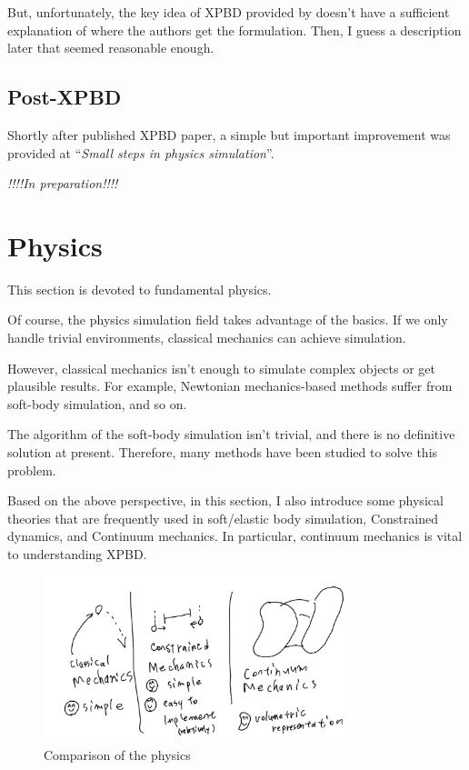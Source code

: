 \documentclass[pdflatex,sn-mathphys-num]{sn-jnl}%
\theoremstyle{thmstyleone}%
\theoremstyle{thmstyletwo}%
\theoremstyle{thmstylethree}%
\newcommand{\mainpname}[1]{``{\sl {#1}}''}
\newcommand{\inprep}{
	\begin{center}
		\sl\rm {!!!!In preparation!!!!}
\end{center}}
\begin{document}
But, unfortunately, the key idea of XPBD provided by \cite{Servin2006InteractiveSO} doesn't have a sufficient explanation of where the authors get the formulation. Then, I guess a description later that seemed reasonable enough.

\subsection{Post-XPBD}
Shortly after published XPBD paper, a simple but important improvement was provided at \mainpname{Small steps in physics simulation}\cite{SmallSteps}.
\inprep
\section{Physics}
This section is devoted to fundamental physics. 

Of course, the physics simulation field takes advantage of the basics.
If we only handle trivial environments, classical mechanics can achieve simulation. 

However, classical mechanics isn't enough to simulate complex objects or get plausible results. For example, Newtonian mechanics-based methods suffer from soft-body simulation, and so on.

The algorithm of the soft-body simulation isn't trivial, and there is no definitive solution at present. Therefore, many methods have been studied to solve this problem.

Based on the above perspective, in this section, I also introduce some physical theories that are frequently used in soft/elastic body simulation, Constrained dynamics, and Continuum mechanics.
In particular, continuum mechanics is vital to understanding XPBD.
\begin{figure}[h]
	\centering
	\includegraphics[width=0.8\textwidth]{images/Physics.png}
	\caption{Comparison of the physics}
		\label{physics}
\end{figure}
\end{document}
